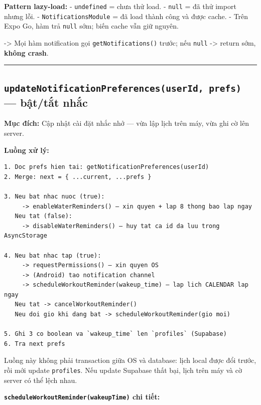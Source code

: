 \documentclass[12pt,a4paper]{article}
\begin{document}
\textbf{Pattern lazy-load:} - \texttt{undefined} = chưa thử load. -
\texttt{null} = đã thử import nhưng lỗi. - \texttt{NotificationsModule}
= đã load thành công và được cache. - Trên Expo Go, hàm trả
\texttt{null} sớm; biến cache vẫn giữ nguyên.

-\textgreater{} Mọi hàm notification gọi \texttt{getNotifications()}
trước; nếu \texttt{null} -\textgreater{} return sớm, \textbf{không
crash}.

\begin{center}\rule{0.5\linewidth}{0.5pt}\end{center}

\subsection{\texorpdfstring{\texttt{updateNotificationPreferences(userId,\ prefs)}
--- bật/tắt
nhắc}{updateNotificationPreferences(userId, prefs) --- bật/tắt nhắc}}\label{updatenotificationpreferencesuserid-prefs-bux1eadttux1eaft-nhux1eafc}

\textbf{Mục đích:} Cập nhật cài đặt nhắc nhở --- vừa lập lịch trên máy,
vừa ghi cờ lên server.

\textbf{Luồng xử lý:}

\begin{verbatim}
1. Doc prefs hien tai: getNotificationPreferences(userId)
2. Merge: next = { ...current, ...prefs }

3. Neu bat nhac nuoc (true):
     -> enableWaterReminders() — xin quyen + lap 8 thong bao lap ngay
   Neu tat (false):
     -> disableWaterReminders() — huy tat ca id da luu trong AsyncStorage

4. Neu bat nhac tap (true):
     -> requestPermissions() — xin quyen OS
     -> (Android) tao notification channel
     -> scheduleWorkoutReminder(wakeup_time) — lap lich CALENDAR lap ngay
   Neu tat -> cancelWorkoutReminder()
   Neu doi gio khi dang bat -> scheduleWorkoutReminder(gio moi)

5. Ghi 3 co boolean va `wakeup_time` len `profiles` (Supabase)
6. Tra next prefs
\end{verbatim}

Luồng này không phải transaction giữa OS và database: lịch local được
đổi trước, rồi mới update \texttt{profiles}. Nếu update Supabase thất
bại, lịch trên máy và cờ server có thể lệch nhau.

\textbf{\texttt{scheduleWorkoutReminder(wakeupTime)} chi tiết:}
\end{document}
